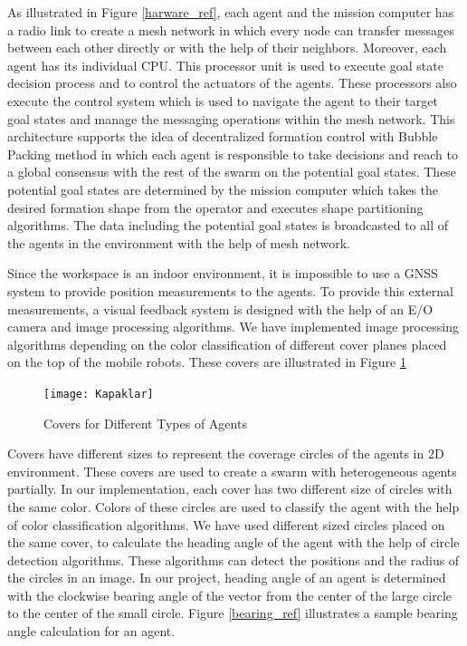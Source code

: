 As illustrated in Figure \ref{harware_ref}, each agent and the mission computer has a radio link to create a mesh network in which every node can transfer messages between each other directly or with the help of their neighbors. Moreover, each agent has its individual CPU. This processor unit is used to execute goal state decision process and to control the actuators of the agents. These processors also execute the control system which is used to navigate the agent to their target goal states and manage the messaging operations within the mesh network.  This architecture supports the idea of decentralized formation control with Bubble Packing method in which each agent is responsible to take decisions and reach to a global consensus with the rest of the swarm on the potential goal states.  These potential goal states are determined by the mission computer which takes the desired formation shape from the operator and executes shape partitioning algorithms. The data including the potential goal states is broadcasted to all of the agents in the environment with the help of mesh network. 

Since the workspace is an indoor environment, it is impossible to use a GNSS system to provide position measurements to the agents. To provide this external measurements, a visual feedback system is designed with the help of an E/O camera and image processing algorithms. We have implemented image processing algorithms depending on the color classification of different cover planes placed on the top of the mobile robots. These covers are illustrated in Figure \ref{kapaklar_ref}

\begin{figure}[H]
\caption{Covers for Different Types of Agents} \label{kapaklar_ref}
\centerline{\texttt{[image: Kapaklar]}}
\end{figure} 
		
Covers have different sizes to represent the coverage circles of the agents in 2D environment. These covers are used to create a swarm with heterogeneous agents partially. In our implementation, each cover has two different size of circles with the same color. Colors of these circles are used to classify the agent with the help of color classification algorithms. We have used different sized circles placed on the same cover, to calculate the heading angle of the agent with the help of circle detection algorithms. These algorithms can detect the positions and the radius of the circles in an image. In our project, heading angle of an agent is determined with the clockwise bearing angle of the vector from the center of the large circle to the center of the small circle. Figure \ref{bearing_ref} illustrates a sample bearing angle calculation for an agent.
		
